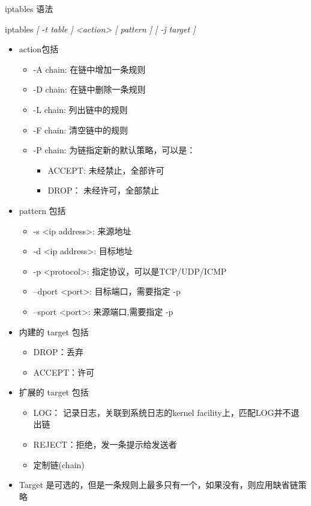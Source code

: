  \begin{frame}[allowframebreaks]{iptables 语法}

iptables \emph{{[} -t table {]} <action> {[} pattern {]} {[} -j target
{]}}
\begin{itemize}
\item action包括

\begin{itemize}
\item -A chain: 在链中增加一条规则
\item -D chain: 在链中删除一条规则
\item -L chain: 列出链中的规则
\item -F chain: 清空链中的规则
\item -P chain: 为链指定新的默认策略，可以是：

\begin{itemize}
\item ACCEPT: 未经禁止，全部许可
\item DROP： 未经许可，全部禁止
\end{itemize}
\end{itemize}
\item pattern 包括

\begin{itemize}
\item -s <ip address>: 来源地址
\item -d <ip address>: 目标地址
\item -p <protocol>: 指定协议，可以是TCP/UDP/ICMP
\item --dport <port>: 目标端口，需要指定 -p
\item --sport <port>: 来源端口,需要指定 -p
\end{itemize}
\item 内建的 target 包括

\begin{itemize}
\item DROP：丢弃
\item ACCEPT：许可
\end{itemize}
\item 扩展的 target 包括

\begin{itemize}
\item LOG： 记录日志，关联到系统日志的kernel facility上，匹配LOG并不退出链
\item REJECT：拒绝，发一条提示给发送者
\item 定制链(chain)
\end{itemize}
\item Target 是可选的，但是一条规则上最多只有一个，如果没有，则应用缺省链策略
\end{itemize}

\end{frame} 
